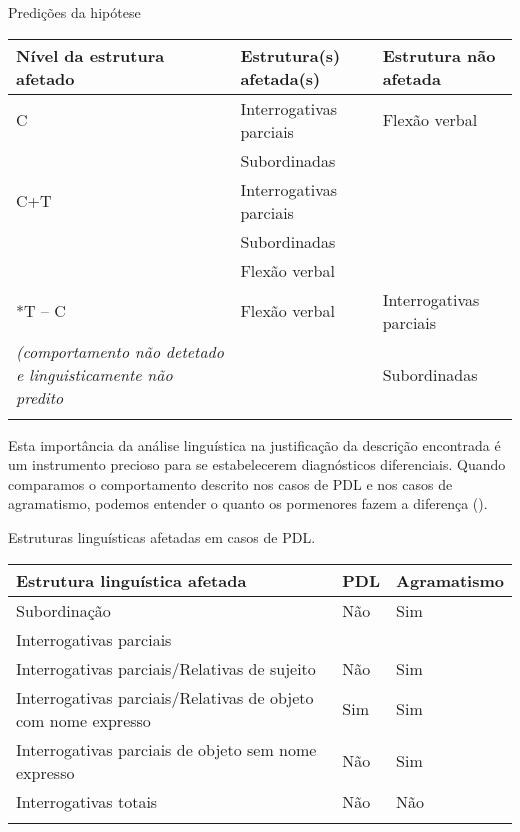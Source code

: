 \documentclass[output=paper,colorlinks,citecolor=brown,booklanguage=portuguese]{langscibook}
\begin{document}
\begin{Tabela}
\caption {Predições da hipótese}
\label{tab:cap2tab1}
\begin{tabularx}{\textwidth}{Qll}
\lsptoprule
 \textbf{Nível da estrutura afetado} & \textbf{Estrutura(s) {afetada(s)}} & \textbf{Estrutura não {afetada}}\\
\midrule
 C & Interrogativas {parciais} & Flexão verbal\\
 & Subordinadas &\\
\tablevspace
 C+T & Interrogativas {parciais}&\\
 & Subordinadas &\\
 & Flexão verbal &\\
\tablevspace
 *T – C & Flexão verbal & Interrogativas {parciais}\\
 \emph{(comportamento não  detetado e linguisticamente não predito} && Subordinadas\\
 \lspbottomrule
\end{tabularx}

\end{Tabela}

Esta importância da análise linguística na justificação da descrição encontrada é um instrumento precioso para se estabelecerem diagnósticos diferenciais. Quan\-do comparamos o comportamento descrito nos casos de PDL e nos casos de agramatismo, podemos entender o quanto os pormenores fazem a diferença ().



\begin{Tabela}
\caption{Estruturas linguísticas afetadas em casos de PDL.}
\label{tab:cap2tab2}
\begin{tabularx}{\textwidth}{Qll}
\lsptoprule
\textbf{Estrutura linguística afetada} & \textbf{PDL} & \textbf{Agramatismo}\\
\midrule
Subordinação& Não & Sim\\ 
\tablevspace
Interrogativas parciais&&\\
\tablevspace
Interrogativas parciais/Relativas de sujeito& Não & Sim\\ 
\tablevspace
Interrogativas parciais/Relativas de objeto com nome expresso & Sim & Sim\\ 
\tablevspace
Interrogativas parciais de objeto sem nome expresso & Não & Sim\\
\tablevspace
Interrogativas totais& Não & Não\\
\lspbottomrule
\end{tabularx}

\end{Tabela}
\end{document}
